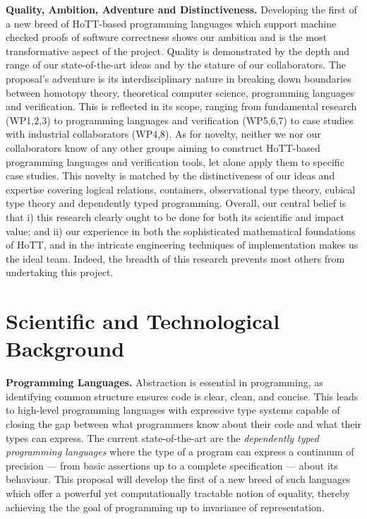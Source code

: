 \documentclass[a4paper,11pt]{article}
\begin{document}
  {\bf Quality, Ambition, Adventure and Distinctiveness.} 
  Developing the first of a new breed of HoTT-based programming
  languages which support machine checked proofs of software
  correctness shows our ambition and is the most transformative
  aspect of the project. Quality is demonstrated by
  the depth and range of our state-of-the-art ideas and by the stature
  of our collaborators. The proposal's adventure is its
  interdisciplinary nature in breaking down boundaries between
  homotopy theory, theoretical computer science, programming languages
  and verification. This is reflected in its scope, ranging from
  fundamental research (WP1,2,3) to programming languages and
  verification (WP5,6,7) to case studies with
  industrial collaborators (WP4,8). As for novelty, neither we
  nor our collaborators know of any other groups aiming to construct
  HoTT-based programming languages and verification tools, let alone
  apply them to specific case studies. This novelty is matched
  by the distinctiveness of our ideas and expertise covering logical
  relations, containers, observational type theory, cubical type
  theory and dependently typed programming.  Overall, our central
  belief is that i) this research clearly ought to be done for both
  its scientific and impact value; and ii) our experience in both the
  sophisticated mathematical foundations of HoTT, and in the intricate
  engineering techniques of implementation makes us the ideal team.
  Indeed, the breadth of this research prevents most others from
  undertaking this project.

\vspace*{-0.1in} 
\vspace*{-0.1in} 
\section{Scientific and Technological Background}
\vspace*{-0.1in} 

{\bf Programming Languages.} Abstraction is essential in programming,
as identifying common structure ensures code is clear, clean, and
concise. This leads to high-level programming languages with
expressive type systems capable of closing the gap between what
programmers know about their code and what their types can express.
The current state-of-the-art are the {\em dependently typed
  programming languages} where the type of a program can express a
continuum of precision --- from basic assertions up to a complete
specification --- about its behaviour. This proposal will develop the
first of a new breed of such languages which offer a powerful yet
computationally tractable notion of equality, thereby achieving the
the goal of programming up to invariance of representation.
\end{document}
